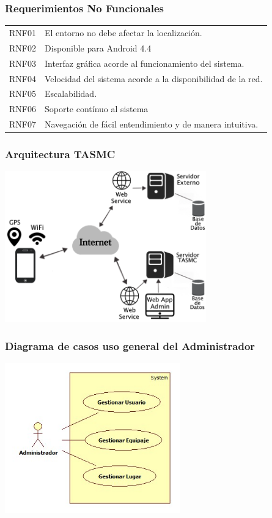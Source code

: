 \documentclass[12pt]{beamer}
\begin{document}
\begin{frame}
	\frametitle{Requerimientos No Funcionales}
	\begin{block}{}
	\begin{center}
	

	\begin{tabular}{c|l}
			RNF01 & El entorno no debe afectar la localización.\\
			RNF02 & Disponible para Android 4.4\\
			RNF03 & Interfaz gráfica acorde al funcionamiento del sistema.\\
      		RNF04 & Velocidad del sistema acorde a la disponibilidad de la red.\\
      		RNF05 & Escalabilidad.\\
      		RNF06 & Soporte contínuo al sistema\\
      		RNF07 & Navegación de fácil entendimiento y de manera intuitiva.\\
		\end{tabular}
			\end{center}
		\end{block}
\end{frame}


\begin{frame}
	\frametitle{Arquitectura TASMC}
	\begin{center}
		\includegraphics[height=6.5cm]{imagenes/arquitectura.png}	
	\end{center}
\end{frame}


\begin{frame}
	\frametitle{Diagrama de casos uso general del Administrador}
	\begin{center}
		\includegraphics[height=6.5cm]{imagenes/cugeneralAdministrador.jpg}	
	\end{center}
\end{frame}
\end{document}
